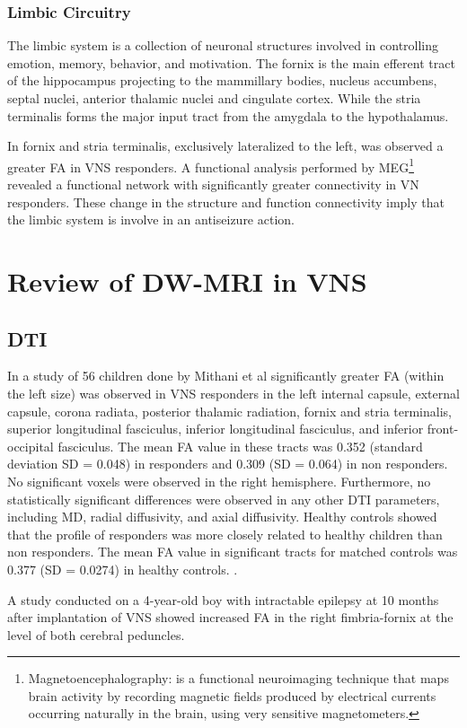 
    \subsubsection*{Limbic Circuitry}
    The limbic system is a collection of neuronal structures involved in controlling emotion, memory, behavior, and motivation. The fornix is the main efferent tract of the hippocampus projecting to the mammillary bodies, nucleus accumbens, septal nuclei, anterior thalamic nuclei and cingulate cortex. While the stria terminalis forms the major input tract from the amygdala to the hypothalamus. 

    In fornix and stria terminalis, exclusively lateralized to the left, was observed a greater FA in VNS responders.
    A functional analysis performed by MEG\footnote{Magnetoencephalography: is a functional neuroimaging technique that maps brain activity by recording magnetic fields produced by electrical currents occurring naturally in the brain, using very sensitive magnetometers.} revealed a functional network with significantly greater connectivity in VN responders.
    These change in the structure and function connectivity imply that the limbic system is involve in an antiseizure action. \cite{Mithani2019, Mithani2020}



\section{Review of DW-MRI in VNS}
  \subsection*{DTI}
  In a study of 56 children done by Mithani et al significantly greater FA (within the left size) was observed in VNS responders in the left internal capsule, external capsule, corona radiata, posterior thalamic radiation, fornix and stria terminalis, superior longitudinal fasciculus, inferior longitudinal fasciculus, and inferior front-occipital fasciculus. The mean FA value in these tracts was 0.352 (standard deviation SD = 0.048) in responders and 0.309 (SD = 0.064) in non responders. No significant voxels were observed in the right hemisphere. Furthermore, no statistically significant differences were observed in any other DTI parameters, including MD, radial diffusivity, and axial diffusivity. Healthy controls showed that the profile of responders was more closely related to healthy children than non responders. The mean FA value in significant tracts for matched controls was 0.377 (SD = 0.0274) in healthy controls. \cite{Mithani2019}.

  A study conducted on a 4-year-old boy with intractable epilepsy at 10 months after implantation of VNS showed increased FA in the right fimbria-fornix at the level of both cerebral peduncles. \cite{Fan2014}

